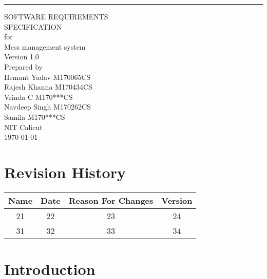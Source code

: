 \documentclass{scrreprt}
\date{}
\def\myversion{1.0 }
\begin{document}
\begin{flushright}
    \rule{16cm}{5pt}\vskip1cm
    \begin{bfseries}
        \Huge{SOFTWARE REQUIREMENTS\\ SPECIFICATION}\\
        \vspace{1.9cm}
        for\\
     Mess management system\\
       
        \LARGE{Version \myversion }\\
        \vspace{1.9cm}
        Prepared by\\ Hemant Yadav M170065CS\\
                    Rajesh Khanna M170434CS\\
                    Vrinda C M170***CS\\
                    Navdeep Singh M170262CS\\
                    Samila M170***CS\\
        \vspace{1.9cm}
        NIT Calicut\\
        \vspace{1.9cm}
        \today\\
    \end{bfseries}
\end{flushright}

\tableofcontents


\chapter*{Revision History}

\begin{center}
    \begin{tabular}{|c|c|c|c|}
        \hline
	    Name & Date & Reason For Changes & Version\\
        \hline
	    21 & 22 & 23 & 24\\
        \hline
	    31 & 32 & 33 & 34\\
        \hline
    \end{tabular}
\end{center}

\chapter{Introduction}
\end{document}
